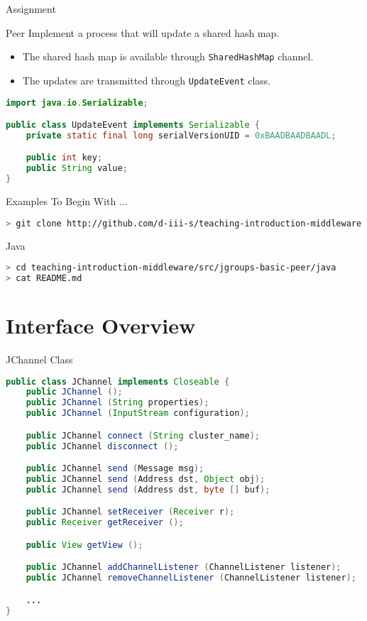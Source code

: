 \begin{frame}[fragile]{Assignment}
    \begin{block}{Peer}
        Implement a process that will update a shared hash map.
        \begin{itemize}
            \item The shared hash map is available through \lstinline{SharedHashMap} channel.
            \item The updates are transmitted through \lstinline{UpdateEvent} class.
        \end{itemize}
    \end{block}

\begin{lstlisting}[language=java,style=mini]
import java.io.Serializable;

public class UpdateEvent implements Serializable {
    private static final long serialVersionUID = 0xBAADBAADBAADL;

    public int key;
    public String value;
}
\end{lstlisting}
\end{frame}


\begin{frame}[fragile]{Examples To Begin With ...}
\begin{lstlisting}[language=bash,style=mini]
> git clone http://github.com/d-iii-s/teaching-introduction-middleware.git
\end{lstlisting}
    \begin{block}{Java}
\begin{lstlisting}[language=bash,style=mini]
> cd teaching-introduction-middleware/src/jgroups-basic-peer/java
> cat README.md
\end{lstlisting}
    \end{block}
\end{frame}


\section{Interface Overview}


\begin{frame}[fragile]{JChannel Class}
\begin{lstlisting}[language=java,style=mini]
public class JChannel implements Closeable {
    public JChannel ();
    public JChannel (String properties);
    public JChannel (InputStream configuration);

    public JChannel connect (String cluster_name);
    public JChannel disconnect ();

    public JChannel send (Message msg);
    public JChannel send (Address dst, Object obj);
    public JChannel send (Address dst, byte [] buf);

    public JChannel setReceiver (Receiver r);
    public Receiver getReceiver ();

    public View getView ();

    public JChannel addChannelListener (ChannelListener listener);
    public JChannel removeChannelListener (ChannelListener listener);

    ...
}
\end{lstlisting}
\end{frame}


